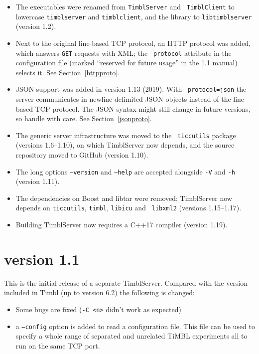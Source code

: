 \documentclass{report}
\begin{document}
\begin{itemize}
\item The executables were renamed from {\tt TimblServer} and {\tt
  TimblClient} to lowercase {\tt timblserver} and {\tt timblclient},
  and the library to {\tt libtimblserver} (version 1.2).
\item Next to the original line-based TCP protocol, an HTTP protocol
  was added, which answers {\tt GET} requests with XML; the {\tt
  protocol} attribute in the configuration file (marked ``reserved for
  future usage'' in the 1.1 manual) selects it. See
  Section~\ref{httpproto}.
\item JSON support was added in version 1.13 (2019). With {\tt
  protocol=json} the server communicates in newline-delimited JSON
  objects instead of the line-based TCP protocol. The JSON syntax
  might still change in future versions, so handle with care. See
  Section~\ref{jsonproto}.
\item The generic server infrastructure was moved to the {\tt
  ticcutils} package (versions 1.6--1.10), on which TimblServer now
  depends, and the source repository moved to GitHub (version 1.10).
\item The long options {\tt --version} and {\tt --help} are accepted
  alongside {\tt -V} and {\tt -h} (version 1.11).
\item The dependencies on Boost and libtar were removed; TimblServer
  now depends on {\tt ticcutils}, {\tt timbl}, {\tt libicu} and {\tt
  libxml2} (versions 1.15--1.17).
\item Building TimblServer now requires a C++17 compiler (version
  1.19).
\end{itemize}

\section{version 1.1}

This is the initial release of a separate TimblServer.  Compared with
the version included in Timbl (up to version 6.2) the following is
changed:

\begin{itemize}
\item Some bugs are fixed ({\tt -C <n>} didn't work as expected)
\item a {\tt --config} option is added to read a configuration file. This
  file can be used to specify a whole range of separated and unrelated
  TiMBL experiments all to run on the same TCP port.
\end{itemize}
\end{document}
